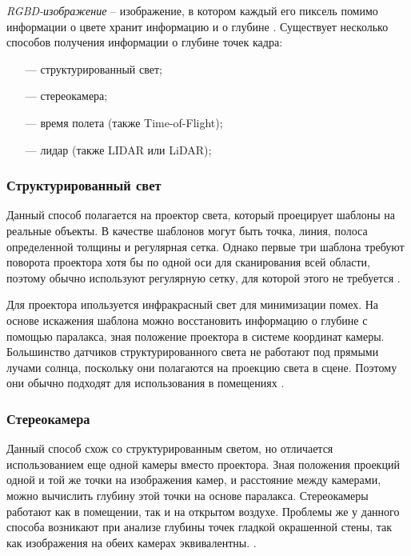 \textit{RGBD-изображение} -- изображение, в котором каждый его пиксель помимо информации о цвете хранит информацию и о глубине \cite{rgbd}. Существует несколько способов получения информации о глубине точек кадра:

\begin{itemize}
	\item[---] структурированный свет;
	\item[---] стереокамера;
	\item[---] время полета (также Time-of-Flight);
	\item[---] лидар (также LIDAR или LiDAR);
\end{itemize}

\subsubsection*{Структурированный свет}

Данный способ полагается на проектор света, который проецирует шаблоны на реальные объекты. В качестве шаблонов могут быть точка, линия, полоса определенной толщины и регулярная сетка. Однако первые три шаблона требуют поворота проектора хотя бы по одной оси для сканирования всей области, поэтому обычно используют регулярную сетку, для которой этого не требуется \cite{struct_light}. 

Для проектора ипользуется инфракрасный свет для минимизации помех. На основе искажения шаблона можно восстановить информацию о глубине с помощью паралакса, зная положение проектора в системе координат камеры. Большинство датчиков структурированного света не работают под прямыми лучами солнца, поскольку они полагаются на проекцию света в сцене. Поэтому они обычно подходят для использования в помещениях \cite{struct_light}.

\subsubsection*{Стереокамера}

Данный способ схож со структурированным светом, но отличается использованием еще одной камеры вместо проектора. Зная положения проекций одной и той же точки на изображения камер, и расстояние между камерами, можно вычислить глубину этой точки на основе паралакса. Стереокамеры работают как в помещении, так и на открытом воздухе. Проблемы же у данного способа возникают при анализе глубины точек гладкой окрашенной стены, так как изображения на обеих камерах эквивалентны. \cite{rgbd}.

